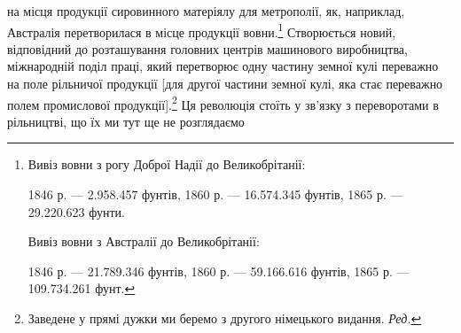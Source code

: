 на місця продукції сировинного матеріялу для метрополії,
як, наприклад, Австралія перетворилася в місце продукції
вовни.\footnote{
\noindent{}Вивіз вовни з рогу Доброї Надії до Великобрітанії:

\noindent{}1846 р. — 2.958.457 фунтів, 1860 р. — 16.574.345 фунтів, 1865 р. —
29.220.623 фунти.

\noindent{}Вивіз вовни з Австралії до Великобрітанії:

\noindent{}1846 р. — 21.789.346 фунтів, 1860 р. — 59.166.616 фунтів, 1865 р. —
109.734.261 фунт.
} Створюється новий, відповідний до розташування головних
центрів машинового виробництва, міжнародній поділ праці,
який перетворює одну частину земної кулі переважно на поле
рільничої продукції [для другої частини земної кулі, яка стає
переважно полем промислової продукції].\footnote*{
Заведене у прямі дужки ми беремо з другого німецького видання.
\emph{Ред.}
} Ця революція стоїть
у зв’язку з переворотами в рільництві, що їх ми тут ще не розглядаємо
